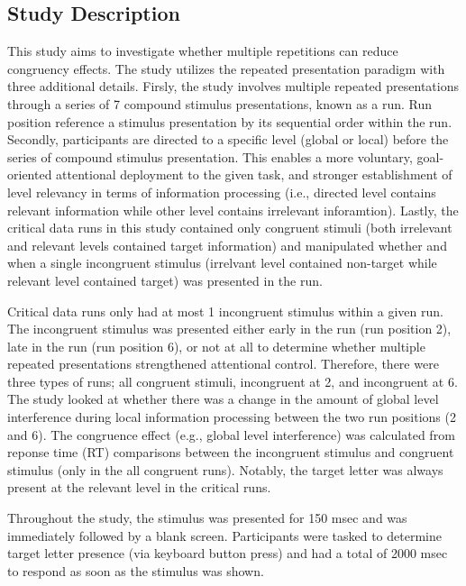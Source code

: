 \documentclass[
]{article}
\begin{document}
\hypertarget{study-description}{%
\subsection{Study Description}\label{study-description}}

This study aims to investigate whether multiple repetitions can reduce
congruency effects. The study utilizes the repeated presentation
paradigm with three additional details. Firsly, the study involves
multiple repeated presentations through a series of 7 compound stimulus
presentations, known as a run. Run position reference a stimulus
presentation by its sequential order within the run. Secondly,
participants are directed to a specific level (global or local) before
the series of compound stimulus presentation. This enables a more
voluntary, goal-oriented attentional deployment to the given task, and
stronger establishment of level relevancy in terms of information
processing (i.e., directed level contains relevant information while
other level contains irrelevant inforamtion). Lastly, the critical data
runs in this study contained only congruent stimuli (both irrelevant and
relevant levels contained target information) and manipulated whether
and when a single incongruent stimulus (irrelvant level contained
non-target while relevant level contained target) was presented in the
run.

Critical data runs only had at most 1 incongruent stimulus within a
given run. The incongruent stimulus was presented either early in the
run (run position 2), late in the run (run position 6), or not at all to
determine whether multiple repeated presentations strengthened
attentional control. Therefore, there were three types of runs; all
congruent stimuli, incongruent at 2, and incongruent at 6. The study
looked at whether there was a change in the amount of global level
interference during local information processing between the two run
positions (2 and 6). The congruence effect (e.g., global level
interference) was calculated from reponse time (RT) comparisons between
the incongruent stimulus and congruent stimulus (only in the all
congruent runs). Notably, the target letter was always present at the
relevant level in the critical runs.

Throughout the study, the stimulus was presented for 150 msec and was
immediately followed by a blank screen. Participants were tasked to
determine target letter presence (via keyboard button press) and had a
total of 2000 msec to respond as soon as the stimulus was shown.
\end{document}

